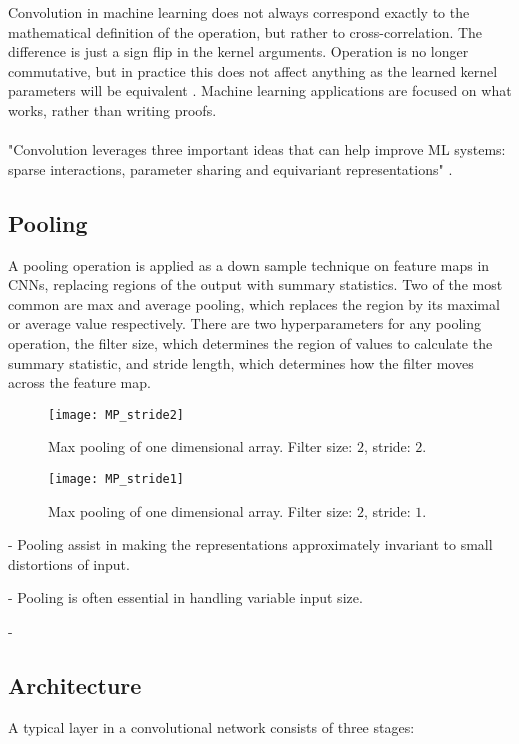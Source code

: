 \documentclass[../../thesis.tex]{subfiles}
\begin{document}
Convolution in machine learning does not always correspond exactly to the mathematical definition of the operation, but rather to cross-correlation. The difference is just a sign flip in the kernel arguments. Operation is no longer commutative, but in practice this does not affect anything as the learned kernel parameters will be equivalent \cite{deeplearningbook}. Machine learning applications are focused on what works, rather than writing proofs. \\\\



"Convolution leverages three important ideas that can help improve ML systems: sparse interactions, parameter sharing and equivariant representations" \cite{deeplearningbook}.

\subsection{Pooling}
A pooling operation is applied as a down sample technique on feature maps in CNNs, replacing regions of the output with summary statistics. Two of the most common are max and average pooling, which replaces the region by its maximal or average value respectively. There are two hyperparameters for any pooling operation, the filter size, which determines the region of values to calculate the summary statistic, and stride length, which determines how the filter moves across the feature map. 

\begin{figure}[h]
    \texttt{[image: MP\_stride2]}
    \centering    
    \caption{Max pooling of one dimensional array. Filter size: $2$, stride: $2$.}
\end{figure}
\begin{figure}[h]
    \texttt{[image: MP\_stride1]}
    \centering    
    \caption{Max pooling of one dimensional array. Filter size: $2$, stride: $1$.}
\end{figure}

- Pooling assist in making the representations approximately invariant to small distortions of input. 

- Pooling is often essential in handling variable input size.

- 

\subsection{Architecture}
A typical layer in a convolutional network consists of three stages: 
\end{document}
